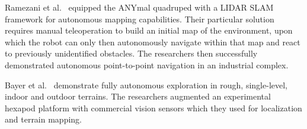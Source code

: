 \documentclass[letterpaper, 10pt, conference]{ieeeconf}      %
\newcommand{\rev}[1]{{\color{blue}#1}} %
\begin{document}
Ramezani et al.~\cite{Ramezani2020} equipped the ANYmal quadruped with a LIDAR SLAM framework for autonomous mapping capabilities. Their particular solution requires manual teleoperation to build an initial map of the environment, upon which the robot can \rev{only} then autonomously navigate within that map and react to previously unidentified obstacles.
The researchers then successfully demonstrated autonomous point-to-point navigation in an industrial complex.

Bayer et al.~\cite{Bayer2019} demonstrate fully autonomous exploration in rough, single-level, indoor and outdoor terrains.
The researchers augmented an experimental hexapod platform with commercial vision sensors which they used for localization and terrain mapping.
\end{document}
